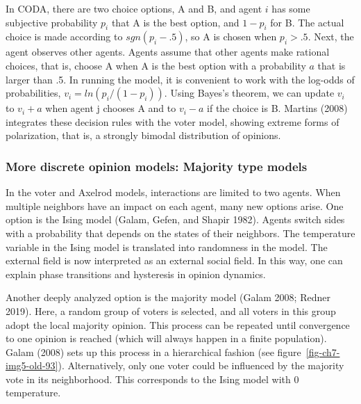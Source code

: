 \documentclass[
  a4paper,
  DIV=11,
  numbers=noendperiod,
  oneside]{scrreprt}
\begin{document}
In CODA, there are two choice options, A and B, and agent \(i\) has some
subjective probability \(p_{i}\) that A is the best option, and
\({1 - p}_{i}\) for B. The actual choice is made according to
\(sgn\left( p_{i} - .5 \right)\), so A is chosen when \(p_{i} > .5\).
Next, the agent observes other agents. Agents assume that other agents
make rational choices, that is, choose A when A is the best option with
a probability \(a\) that is larger than .5. In running the model, it is
convenient to work with the log-odds of probabilities,
\(v_{i} = ln({p_{i}}/({1 - p_{i}}))\). Using Bayes's theorem, we can
update \(v_{i}\) to \(v_{i} + a\) when agent j chooses A and to
\(v_{i} - a\) if the choice is B. Martins (2008) integrates these
decision rules with the voter model, showing extreme forms of
polarization, that is, a strongly bimodal distribution of opinions.

\subsubsection{More discrete opinion models: Majority type
models}\label{sec-More-discrete-opinion-models-majority-type-models}

In the voter and Axelrod models, interactions are limited to two agents.
When multiple neighbors have an impact on each agent, many new options
arise. One option is the Ising model (Galam, Gefen, and Shapir 1982).
Agents switch sides with a probability that depends on the states of
their neighbors. The temperature variable in the Ising model is
translated into randomness in the model. The external field is now
interpreted as an external social field. In this way, one can explain
phase transitions and hysteresis in opinion dynamics.

Another deeply analyzed option is the majority model (Galam 2008; Redner
2019). Here, a random group of voters is selected, and all voters in
this group adopt the local majority opinion. This process can be
repeated until convergence to one opinion is reached (which will always
happen in a finite population). Galam (2008) sets up this process in a
hierarchical fashion (see figure~\ref{fig-ch7-img5-old-93}).
Alternatively, only one voter could be influenced by the majority vote
in its neighborhood. This corresponds to the Ising model with 0
temperature.
\end{document}
